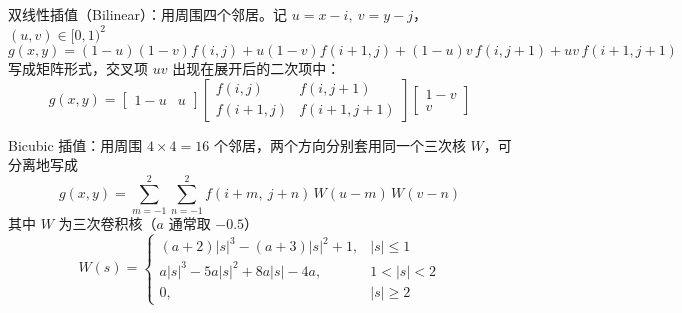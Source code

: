 \documentclass{ctexart}
\begin{document}
双线性插值（Bilinear）：用周围四个邻居。记 $u=x-i,\ v=y-j$，$(u,v)\in[0,1)^2$
\[
g(x,y)=(1-u)(1-v)f(i,j)+u(1-v)f(i+1,j)+(1-u)v\,f(i,j+1)+uv\,f(i+1,j+1)
\]
写成矩阵形式，交叉项 $uv$ 出现在展开后的二次项中：
\[
g(x,y)=
\begin{bmatrix}1-u & u\end{bmatrix}
\begin{bmatrix}f(i,j) & f(i,j+1)\\ f(i+1,j) & f(i+1,j+1)\end{bmatrix}
\begin{bmatrix}1-v\\ v\end{bmatrix}
\]

Bicubic 插值：用周围 $4\times4=16$ 个邻居，两个方向分别套用同一个三次核 $W$，可分离地写成
\[
g(x,y)=\sum_{m=-1}^{2}\sum_{n=-1}^{2} f(i+m,\ j+n)\,W(u-m)\,W(v-n)
\]
其中 $W$ 为三次卷积核（$a$ 通常取 $-0.5$）
\[
W(s)=
\begin{cases}
(a+2)|s|^3-(a+3)|s|^2+1, & |s|\le 1\\[2pt]
a|s|^3-5a|s|^2+8a|s|-4a, & 1<|s|<2\\[2pt]
0, & |s|\ge 2
\end{cases}
\]
\end{document}
